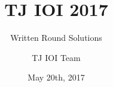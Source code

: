 \documentclass[a4paper,11pt]{scrartcl}
\begin{document}
\title{TJ IOI 2017}
\subtitle{Written Round Solutions}
\date{May 20th, 2017}

\author{TJ IOI Team}
\end{document}

